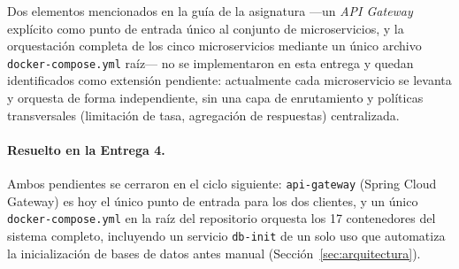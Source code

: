 Dos elementos mencionados en la guía de la asignatura —un \emph{API Gateway} explícito como punto
de entrada único al conjunto de microservicios, y la orquestación completa de los cinco
microservicios mediante un único archivo \texttt{docker-compose.yml} raíz— no se implementaron en
esta entrega y quedan identificados como extensión pendiente: actualmente cada microservicio se
levanta y orquesta de forma independiente, sin una capa de enrutamiento y políticas transversales
(limitación de tasa, agregación de respuestas) centralizada.

\paragraph{Resuelto en la Entrega 4.} Ambos pendientes se cerraron en el ciclo siguiente:
\texttt{api-gateway} (Spring Cloud Gateway) es hoy el único punto de entrada para los dos
clientes, y un único \texttt{docker-compose.yml} en la raíz del repositorio orquesta los 17
contenedores del sistema completo, incluyendo un servicio \texttt{db-init} de un solo uso que
automatiza la inicialización de bases de datos antes manual (Sección~\ref{sec:arquitectura}).
